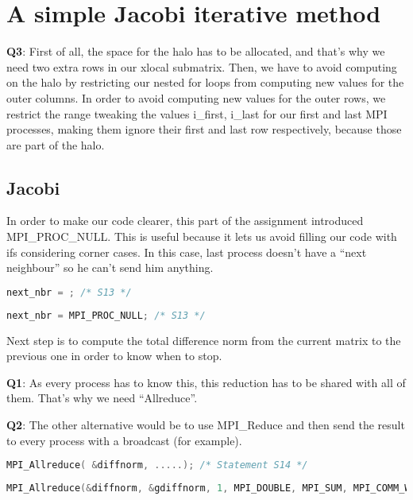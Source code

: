 \documentclass[a4paper, 10pt]{article}
\begin{document}
\section{A simple Jacobi iterative method}

\textbf{Q3}: First of all, the space for the halo has to be allocated, and that's why we need two extra rows in our xlocal submatrix. Then, we have to avoid computing on the halo by restricting our nested for loops from computing new values for the outer columns. In order to avoid computing new values for the outer rows, we restrict the range tweaking the values i\_first, i\_{last} for our first and last MPI processes, making them ignore their first and last row respectively, because those are part of the halo. 

\subsection{Jacobi}
    In order to make our code clearer, this part of the assignment introduced MPI\_PROC\_NULL. This is useful because it lets us avoid filling our code with ifs considering corner cases. In this case, last process doesn't have a ``next neighbour'' so he can't send him anything. 
    \begin{lstlisting}[language=c, caption={Template S13}]
next_nbr = ; /* S13 */
    \end{lstlisting}

    \begin{lstlisting}[language=c, caption={Correct S13}]
next_nbr = MPI_PROC_NULL; /* S13 */
    \end{lstlisting}


Next step is to compute the total difference norm from the current matrix to the previous one in order to know when to stop. 

\textbf{Q1}: As every process has to know this, this reduction has to be shared with all of them. That's why we need ``Allreduce''. 

\textbf{Q2}: The other alternative would be to use MPI\_Reduce and then send the result to every process with a broadcast (for example).
    \begin{lstlisting}[language=c, caption={Template S14}]
MPI_Allreduce( &diffnorm, .....); /* Statement S14 */
    \end{lstlisting}

    \begin{lstlisting}[language=c, caption={Correct S14}]
MPI_Allreduce(&diffnorm, &gdiffnorm, 1, MPI_DOUBLE, MPI_SUM, MPI_COMM_WORLD); /* S14 */
    \end{lstlisting}
\end{document}
